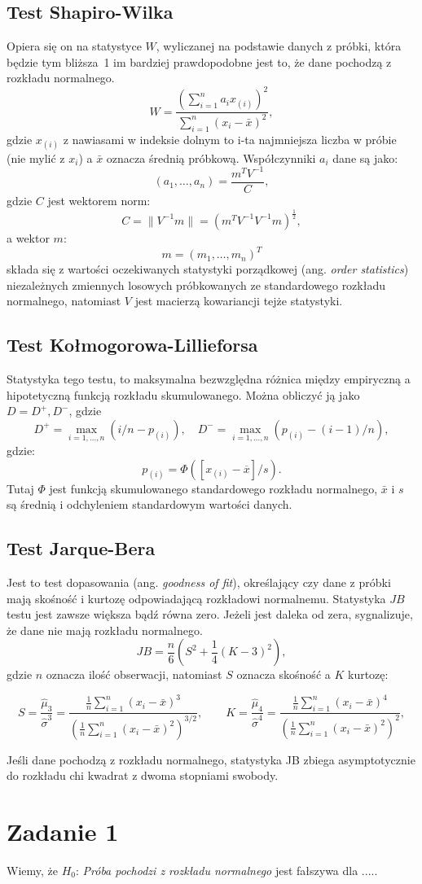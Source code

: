 \documentclass{article}
\theoremstyle{break}
\begin{document}
	\subsection*{Test Shapiro-Wilka}
	Opiera się on na statystyce $W$, wyliczanej na podstawie danych z próbki, która będzie tym bliższa~1 im bardziej prawdopodobne jest to, że dane pochodzą z rozkładu normalnego.
	$$W = \frac{(\sum_{i=1}^{n}a_i x_{(i)})^2}{\sum_{i=1}^{n} (x_i - \bar{x})^2},$$
	gdzie $x_{{(i)}}$ z nawiasami w indeksie dolnym to i-ta najmniejsza liczba w próbie (nie mylić z $x_{i}$) a $\bar{x}$ oznacza średnią próbkową. Współczynniki $a_i$ dane są jako:
	$$(a_1, \dots, a_n) = \frac{m^T V^{-1}}{C},$$
	 gdzie $C$ jest wektorem norm:
	 $$C = \|V^{-1} m\| = (m^T V^{-1} V^{-1} m)^{\frac{1}{2}},$$
	 a wektor $m$:
	 $$m = (m_1,\dots,m_n)^T$$
	składa się z wartości oczekiwanych statystyki porządkowej (ang. \textit{order statistics}) niezależnych zmiennych losowych próbkowanych ze standardowego rozkładu normalnego, natomiast $V$ jest macierzą kowariancji tejże statystyki.
	
	\subsection*{Test Kołmogorowa-Lillieforsa}
	Statystyka tego testu, to maksymalna bezwzględna różnica między empiryczną a hipotetyczną funkcją rozkładu skumulowanego. Można obliczyć ją jako $D = D^+, D^-$, gdzie
	$$D^{+} = \max_{i=1,..., n}(i/n - p_{(i)}),\quad D^{-} = \max_{i=1,..., n}(p_{(i)} - (i-1)/n),$$
	gdzie: $$p_{(i)} = \Phi([x_{(i)} - \overline{x}]/s).$$ Tutaj $\Phi$ jest funkcją skumulowanego standardowego rozkładu normalnego, $\bar{x}$ i $s$ są średnią i odchyleniem standardowym wartości danych. 

	\subsection*{Test Jarque-Bera}
	 Jest to test dopasowania (ang. \textit{goodness of fit}), określający czy dane z próbki mają skośność i kurtozę odpowiadającą rozkładowi normalnemu. Statystyka $JB$ testu jest zawsze większa bądź równa zero. Jeżeli jest daleka od zera, sygnalizuje, że dane nie mają rozkładu normalnego.
	 $$JB = \frac{n}{6} \left( S^2 + \frac{1}{4} (K-3)^2 \right),$$
	 gdzie $n$ oznacza ilość obserwacji, natomiast $S$ oznacza skośność a $K$ kurtozę:
	 
	 $$S={\frac  {{\hat  {\mu }}_{3}}{{\hat  {\sigma }}^{3}}}={\frac  {{\frac  1n}\sum _{{i=1}}^{n}(x_{i}-{\bar  {x}})^{3}}{\left({\frac  1n}\sum _{{i=1}}^{n}(x_{i}-{\bar  {x}})^{2}\right)^{{3/2}}}},\qquad K={\frac {{\hat {\mu }}_{4}}{{\hat {\sigma }}^{4}}}={\frac {{\frac {1}{n}}\sum _{i=1}^{n}(x_{i}-{\bar {x}})^{4}}{\left({\frac {1}{n}}\sum _{i=1}^{n}(x_{i}-{\bar {x}})^{2}\right)^{2}}},$$
	 
	 Jeśli dane pochodzą z rozkładu normalnego, statystyka JB zbiega asymptotycznie do rozkładu chi kwadrat z dwoma stopniami swobody.
	\section*{Zadanie 1}
	Wiemy, że $H_0$: \textit{Próba pochodzi z rozkładu normalnego} jest fałszywa dla .....
\end{document}
